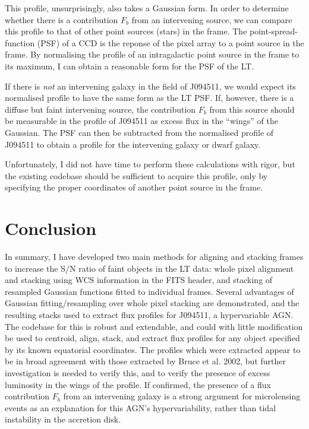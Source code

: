 \documentclass[a4paper,11pt]{article}
\begin{document}
This profile, unsurprisingly, also takes a Gaussian form. In order to determine whether there is a contribution $F_b$ from an intervening source, we can compare this profile to that of other point sources (stars) in the frame. The point-spread-function (PSF) of a CCD is the reponse of the pixel array to a point source in the frame.\cite{photutils_psf}\cite{anderson_2000} By normalising the profile of an intragalactic point source in the frame to its maximum, I can obtain a reasonable form for the PSF of the LT.

If there is \textit{not} an intervening galaxy in the field of J094511, we would expect its normalised profile to have the same form as the LT PSF. If, however, there is a diffuse but faint intervening source, the contribution $F_b$ from this source should be measurable in the profile of J094511 as excess flux in the ``wings'' of the Gaussian. The PSF can then be subtracted from the normalised profile of J094511 to obtain a profile for the intervening galaxy or dwarf galaxy.

Unfortunately, I did not have time to perform these calculations with rigor, but the existing codebase should be sufficient to acquire this profile, only by specifying the proper coordinates of another point source in the frame.

\section{Conclusion}

In summary, I have developed two main methods for aligning and stacking frames to increase the S/N ratio of faint objects in the LT data: whole pixel alignment and stacking using WCS information in the FITS header, and stacking of resampled Gaussian functions fitted to individual frames. Several advantages of Gaussian fitting/resampling over whole pixel stacking are demonstrated, and the resulting stacks used to extract flux profiles for J094511, a hypervariable AGN. The codebase for this is robust and extendable, and could with little modification be used to centroid, align, stack, and extract flux profiles for any object specified by its known equatorial coordinates. The profiles which were extracted appear to be in broad agreement with those extracted by Bruce et al. 2002, but further investigation is needed to verify this, and to verify the presence of excess luminosity in the wings of the profile. If confirmed, the presence of a flux contribution $F_b$ from an intervening galaxy is a strong argument for microlensing events as an explanation for this AGN's hypervariability, rather than tidal instability in the accretion disk.
\end{document}

